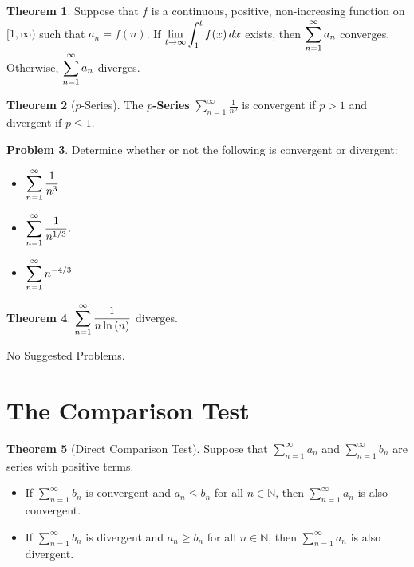 \documentclass[letterpaper, twoside, 12pt]{book}
\theoremstyle{definition}
\newtheorem{theorem}{Theorem}
\theoremstyle{definition}
\newtheorem{problem}[theorem]{Problem}
\newcommand{\ds}{\ensuremath{\displaystyle}}
\begin{document}
\begin{theorem}
 Suppose that $f$ is a continuous, positive, non-increasing function on
 $[1, \infty)$ such that $a_n = f(n)$.
 If $\ds\lim_{t \rightarrow \infty} \int_1^t f(x) \, dx$ exists,
 then $\ds\sum_{n=1}^{\infty} a_n$ converges.
 Otherwise, $\ds\sum_{n=1}^{\infty} a_n$ diverges.
\end{theorem}

\begin{theorem}[$p$-Series]
 The \textbf{$p$-Series} $\sum_{n=1}^{\infty} \frac{1}{n^p}$ is convergent if $p > 1$ and divergent if $p \leq 1$.
\end{theorem}

\begin{problem}
 Determine whether or not the following is convergent or divergent:
 \begin{itemize}
  \item $\ds \sum_{n=1}^{\infty} \frac{1}{n^3}$
  \item $\ds \sum_{n=1}^{\infty} \frac{1}{n^{1/3}}.$
  \item $\ds \sum_{n=1}^\infty n^{-{4/3}}$
 \end{itemize}
\end{problem}

\vfill

\begin{theorem}
 $\ds \sum_{n=1}^{\infty} \frac{1}{n\ln\left(n\right)}$ diverges.
\end{theorem}

\noindent No Suggested Problems.

\newpage

\section{The Comparison Test}

\begin{theorem}[Direct Comparison Test]
 Suppose that $\sum_{n=1}^{\infty} a_n$ and $\sum_{n=1}^{\infty} b_n$ are series with positive terms.
 \begin{itemize}
  \item If $\sum_{n=1}^{\infty} b_n$ is convergent and $a_n \leq b_n$ for all $n \in \mathbb{N}$, then $\sum_{n=1}^{\infty} a_n$ is also convergent.
  \item If $\sum_{n=1}^{\infty} b_n$ is divergent and $a_n \geq b_n$ for all $n \in \mathbb{N}$, then $\sum_{n=1}^{\infty} a_n$ is also divergent.
 \end{itemize}
\end{theorem}
\end{document}
